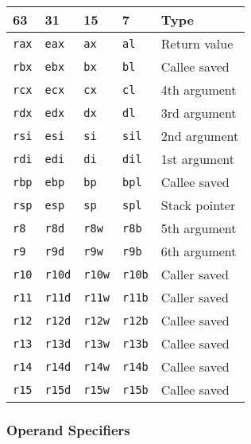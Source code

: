 \documentclass[10pt]{armath}
\newcommand{\s}[1]{\texttt{#1}}
\begin{document}
\begin{center}
  \begin{tabular}{l l l l l}
    63 & 31 & 15 & 7 & Type\\
    \hline
    \s{rax} & \s{eax} & \s{ax} & \s{al} & Return value\\
    \s{rbx} & \s{ebx} & \s{bx} & \s{bl} & Callee saved\\
    \s{rcx} & \s{ecx} & \s{cx} & \s{cl} & 4th argument\\
    \s{rdx} & \s{edx} & \s{dx} & \s{dl} & 3rd argument\\
    \s{rsi} & \s{esi} & \s{si} & \s{sil} & 2nd argument\\
    \s{rdi} & \s{edi} & \s{di} & \s{dil} & 1st argument\\
    \s{rbp} & \s{ebp} & \s{bp} & \s{bpl} & Callee saved\\
    \s{rsp} & \s{esp} & \s{sp} & \s{spl} & Stack pointer\\
    \s{r8} & \s{r8d} & \s{r8w} & \s{r8b} & 5th argument\\
    \s{r9} & \s{r9d} & \s{r9w} & \s{r9b} & 6th argument\\
    \s{r10} & \s{r10d} & \s{r10w} & \s{r10b} & Caller saved\\
    \s{r11} & \s{r11d} & \s{r11w} & \s{r11b} & Caller saved\\
    \s{r12} & \s{r12d} & \s{r12w} & \s{r12b} & Callee saved\\
    \s{r13} & \s{r13d} & \s{r13w} & \s{r13b} & Callee saved\\
    \s{r14} & \s{r14d} & \s{r14w} & \s{r14b} & Callee saved\\
    \s{r15} & \s{r15d} & \s{r15w} & \s{r15b} & Callee saved\\
    \hline
  \end{tabular}
\end{center}

\subsubsection{Operand Specifiers}%
\label{ssub:operand_specifiers}
\end{document}
